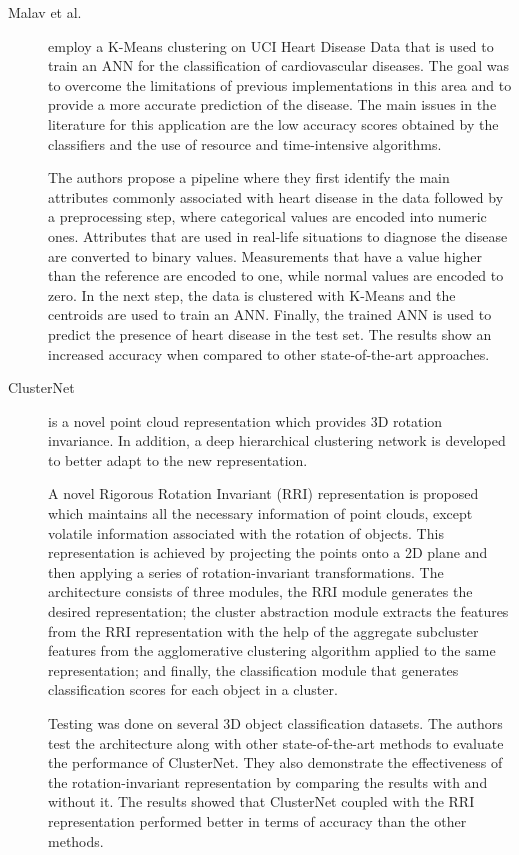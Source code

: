 \begin{description}
    \item[Malav et al.]\cite{Malav.Kadam.ea_PREDICTIONHEARTDISEASE_2017} employ a K-Means clustering on UCI Heart Disease Data that is used to train an ANN for the classification of cardiovascular diseases. The goal was to overcome the limitations of previous implementations in this area and to provide a more accurate prediction of the disease. The main issues in the literature for this application are the low accuracy scores obtained by the classifiers and the use of resource and time-intensive algorithms.
    
    The authors propose a pipeline where they first identify the main attributes commonly associated with heart disease in the data followed by a preprocessing step, where categorical values are encoded into numeric ones. Attributes that are used in real-life situations to diagnose the disease are converted to binary values. Measurements that have a value higher than the reference are encoded to one, while normal values are encoded to zero. In the next step, the data is clustered with K-Means and the centroids are used to train an ANN. Finally, the trained ANN is used to predict the presence of heart disease in the test set. The results show an increased accuracy when compared to other state-of-the-art approaches.
\end{description}

\begin{description}
    \item[ClusterNet]\cite{Chen.Li.ea_ClusterNetDeepHierarchical_2019} is a novel point cloud representation which provides 3D rotation invariance. In addition, a deep hierarchical clustering network is developed to better adapt to the new representation.
    
    A novel Rigorous Rotation Invariant (RRI) representation is proposed which maintains all the necessary information of point clouds, except volatile information associated with the rotation of objects. This representation is achieved by projecting the points onto a 2D plane and then applying a series of rotation-invariant transformations. The architecture consists of three modules, the RRI module generates the desired representation; the cluster abstraction module extracts the features from the RRI representation with the help of the aggregate subcluster features from the agglomerative clustering algorithm applied to the same representation; and finally, the classification module that generates classification scores for each object in a cluster.

    Testing was done on several 3D object classification datasets. The authors test the architecture along with other state-of-the-art methods to evaluate the performance of ClusterNet. They also demonstrate the effectiveness of the rotation-invariant representation by comparing the results with and without it. The results showed that ClusterNet coupled with the RRI representation performed better in terms of accuracy than the other methods.
\end{description}

